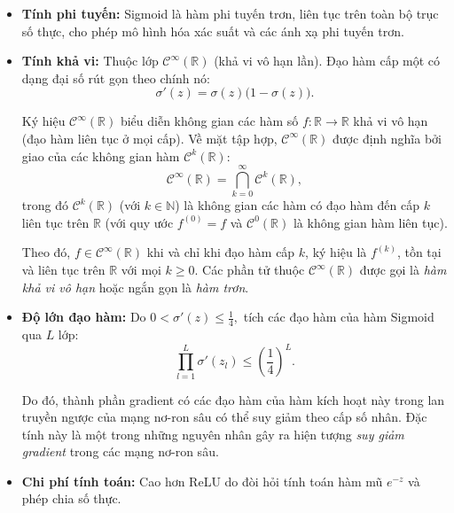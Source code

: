 \begin{itemize}
    \item \textbf{Tính phi tuyến:} Sigmoid là hàm phi tuyến trơn, liên tục trên toàn bộ trục số thực, cho phép mô hình hóa xác suất và các ánh xạ phi tuyến trơn.
    
    \item \textbf{Tính khả vi:} Thuộc lớp $\mathcal{C}^\infty(\mathbb{R})$ (khả vi vô hạn lần). Đạo hàm cấp một có dạng đại số rút gọn theo chính nó:
    \[\sigma'(z) = \sigma(z)\bigl(1 - \sigma(z)\bigr).\]

    Ký hiệu $\mathcal{C}^{\infty}(\mathbb{R})$ biểu diễn không gian các hàm số $f: \mathbb{R} \to \mathbb{R}$ khả vi vô hạn (đạo hàm liên tục ở mọi cấp). Về mặt tập hợp, $\mathcal{C}^{\infty}(\mathbb{R})$ được định nghĩa bởi giao của các không gian hàm $\mathcal{C}^k(\mathbb{R})$:
    \begin{equation}
    \label{eq:smooth_functions_space}
    \mathcal{C}^{\infty}(\mathbb{R}) = \bigcap_{k=0}^{\infty} \mathcal{C}^{k}(\mathbb{R}),
    \end{equation}
    trong đó $\mathcal{C}^k(\mathbb{R})$ (với $k \in \mathbb{N}$) là không gian các hàm có đạo hàm đến cấp $k$ liên tục trên $\mathbb{R}$ (với quy ước $f^{(0)} = f$ và $\mathcal{C}^0(\mathbb{R})$ là không gian hàm liên tục). 
    
    Theo đó, $f \in \mathcal{C}^{\infty}(\mathbb{R})$ khi và chỉ khi đạo hàm cấp $k$, ký hiệu là $f^{(k)}$, tồn tại và liên tục trên $\mathbb{R}$ với mọi $k \geq 0$. Các phần tử thuộc $\mathcal{C}^{\infty}(\mathbb{R})$ được gọi là \textit{hàm khả vi vô hạn} hoặc ngắn gọn là \textit{hàm trơn}. \cite{Wang2021Lec02}

    \item \textbf{Độ lớn đạo hàm:} Do $0 < \sigma'(z) \leq \frac{1}{4},$ tích các đạo hàm của hàm Sigmoid qua \(L\) lớp: $$\prod_{l=1}^{L}\sigma'(z_l)\leq\left(\frac{1}{4}\right)^L.$$
    
    Do đó, thành phần gradient có các đạo hàm của hàm kích hoạt này trong lan truyền ngược của mạng nơ-ron sâu có thể suy giảm theo cấp số nhân. Đặc tính này là một trong những nguyên nhân gây ra hiện tượng \textit{suy giảm gradient} trong các mạng nơ-ron sâu.

    \item \textbf{Chi phí tính toán:} Cao hơn ReLU do đòi hỏi tính toán hàm mũ $e^{-z}$ và phép chia số thực.
\end{itemize}

